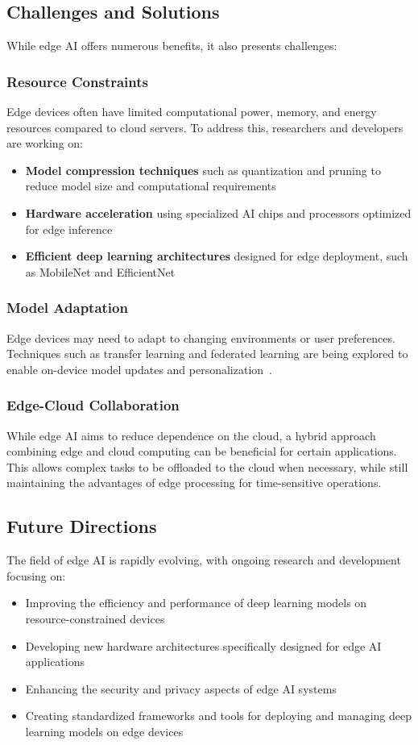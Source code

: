 \documentclass[9pt,a4paper,twoside]{rho-class/rho}
\begin{document}
\subsection{Challenges and Solutions}
While edge AI offers numerous benefits, it also presents challenges:

\subsubsection{Resource Constraints}
Edge devices often have limited computational power, memory, and energy resources compared to cloud servers. To address this, researchers and developers are working on:
\begin{itemize}
    \item \textbf{Model compression techniques} such as quantization and pruning to reduce model size and computational requirements
    \item \textbf{Hardware acceleration} using specialized AI chips and processors optimized for edge inference~\cite{kim2024efficient}
    \item \textbf{Efficient deep learning architectures} designed for edge deployment, such as MobileNet and EfficientNet
\end{itemize}

\subsubsection{Model Adaptation}
Edge devices may need to adapt to changing environments or user preferences. Techniques such as transfer learning and federated learning are being explored to enable on-device model updates and personalization~\cite{yang2024adaptive}.

\subsubsection{Edge-Cloud Collaboration}
While edge AI aims to reduce dependence on the cloud, a hybrid approach combining edge and cloud computing can be beneficial for certain applications. This allows complex tasks to be offloaded to the cloud when necessary, while still maintaining the advantages of edge processing for time-sensitive operations.

\subsection{Future Directions}
The field of edge AI is rapidly evolving, with ongoing research and development focusing on:
\begin{itemize}
    \item Improving the efficiency and performance of deep learning models on resource-constrained devices
    \item Developing new hardware architectures specifically designed for edge AI applications
    \item Enhancing the security and privacy aspects of edge AI systems
    \item Creating standardized frameworks and tools for deploying and managing deep learning models on edge devices
\end{itemize}
\end{document}
